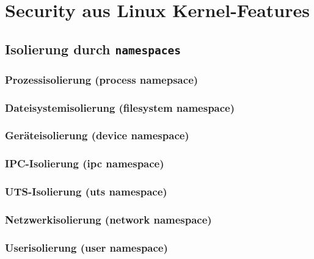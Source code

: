 \documentclass[../main.tex]{subfiles}
\begin{document}
\chapter{Security aus Linux Kernel-Features}
\label{secLinux}
	\section{Isolierung durch \texttt{namespaces}}
  \label{secIsolierung}
		\subsection{Prozessisolierung (process namepsace)}
    \subsection{Dateisystemisolierung (filesystem namespace)}
    \subsection{Geräteisolierung (device namespace)}
    \subsection{IPC-Isolierung (ipc namespace)}
    \subsection{UTS-Isolierung (uts namespace)}
    \subsection{Netzwerkisolierung (network namespace)}
    \subsection{Userisolierung (user namespace)}
\end{document}
